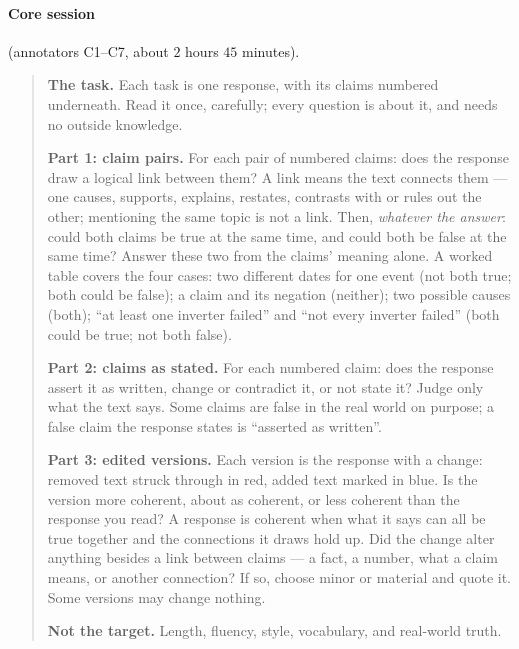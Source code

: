 \paragraph{Core session} (annotators C1--C7, about $2$ hours $45$ minutes).
\begin{quote}\small
\textbf{The task.} Each task is one response, with its claims numbered underneath. Read it once, carefully; every
question is about it, and needs no outside knowledge.

\textbf{Part 1: claim pairs.} For each pair of numbered claims: does the response draw a logical link between them?
A link means the text connects them --- one causes, supports, explains, restates, contrasts with or rules out the
other; mentioning the same topic is not a link. Then, \emph{whatever the answer}: could both claims be true at the
same time, and could both be false at the same time? Answer these two from the claims' meaning alone. A worked table
covers the four cases: two different dates for one event (not both true; both could be false); a claim and its
negation (neither); two possible causes (both); ``at least one inverter failed'' and ``not every inverter failed''
(both could be true; not both false).

\textbf{Part 2: claims as stated.} For each numbered claim: does the response assert it as written, change or
contradict it, or not state it? Judge only what the text says. Some claims are false in the real world on purpose;
a false claim the response states is ``asserted as written''.

\textbf{Part 3: edited versions.} Each version is the response with a change: removed text struck through in red,
added text marked in blue. Is the version more coherent, about as coherent, or less coherent than the response you
read? A response is coherent when what it says can all be true together and the connections it draws hold up. Did the
change alter anything besides a link between claims --- a fact, a number, what a claim means, or another connection?
If so, choose minor or material and quote it. Some versions may change nothing.

\textbf{Not the target.} Length, fluency, style, vocabulary, and real-world truth.
\end{quote}

